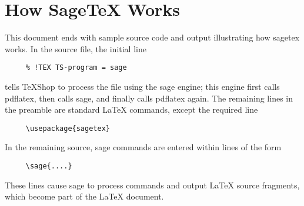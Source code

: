 \documentclass[11pt, oneside]{amsart}
\begin{document}

%
%
%



\section{How SageTeX Works}

This document ends with sample source code and output illustrating how sagetex works.
 In the source file, the initial line
\begin{verbatim}
     % !TEX TS-program = sage
\end{verbatim}
tells TeXShop to process the file using the sage engine; this engine first calls pdflatex, then calls sage, and finally calls pdflatex again.
The remaining lines in the preamble are standard LaTeX commands, except the required line
\begin{verbatim}
     \usepackage{sagetex}
\end{verbatim}
In the remaining source, sage commands are entered within lines of the form
\begin{verbatim}
     \sage{....}
\end{verbatim}
These lines cause sage to process commands and output LaTeX source fragments, which become part of the LaTeX document.
\end{document}
